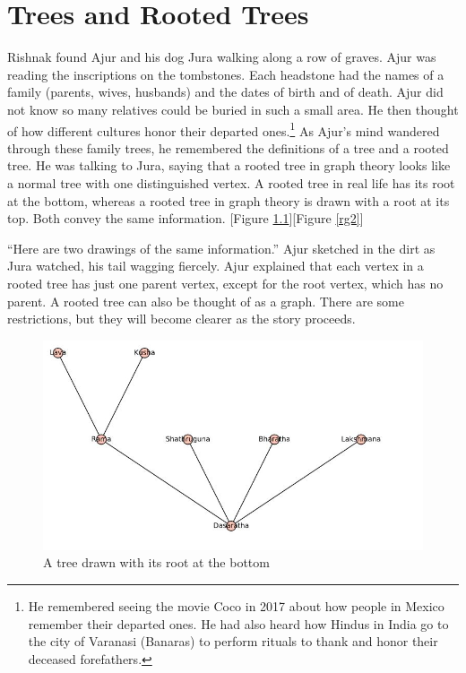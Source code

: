 \chapter{Trees and Rooted Trees}

Rishnak found Ajur and his dog Jura walking along a row of graves. Ajur was reading the inscriptions on the tombstones. Each headstone had the names of a family (parents, wives, husbands) and the dates of birth and of death. Ajur did not know so many relatives could be buried in such a small area. He then thought of how different cultures honor their departed ones.\footnote{He remembered seeing the movie Coco in 2017 about how people in Mexico remember their departed ones. He had also heard how Hindus in India go to the city of Varanasi (Banaras) to perform rituals to thank and honor their deceased forefathers.}
As Ajur's mind wandered through these family trees, he remembered the definitions of a tree and a rooted tree. He was talking to Jura, saying that a rooted tree in graph theory looks like a normal tree with one distinguished vertex. A rooted tree in real life has its root at the bottom, whereas a rooted tree in graph theory is drawn with a root at its top. Both convey the same information. [Figure \ref{rg1}][Figure \ref{rg2}]

``Here are two drawings of the same information.'' Ajur sketched in the dirt as Jura watched, his tail wagging fiercely. Ajur explained that each vertex in a rooted tree has just one parent vertex, except for the root vertex, which has no parent. A rooted tree can also be thought of as a graph. There are some restrictions, but they will become clearer as the story proceeds.


\begin{figure}
\begin{center}
\includegraphics[width=\textwidth]{tree1.JPG}
\caption{A tree drawn with its root at the bottom}\label{rg1}
\end{center}
\end{figure}

